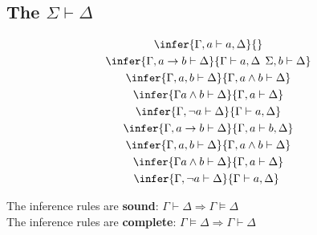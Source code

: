 \documentclass{article}
\begin{document}
\subsection{The $\Sigma \vdash \Delta$}
\begin{gather*}
    \infer{\Gamma, a\vdash a, \Delta}{}\\
    \infer{\Gamma, a \to b \vdash \Delta}{\Gamma \vdash a, \Delta\:\:\Sigma,b\vdash \Delta}\\
    \infer{\Gamma,a,b\vdash \Delta}{\Gamma,a\wedge b\vdash \Delta}\\ 
    \infer{\Gamma a\wedge b\vdash \Delta}{\Gamma, a\vdash \Delta}\\ 
    \infer{\Gamma,\neg a\vdash\Delta}{\Gamma\vdash a,\Delta}\\
    \infer{\Gamma, a \to b \vdash \Delta}{\Gamma,a\vdash b, \Delta}\\
    \infer{\Gamma,a,b\vdash \Delta}{\Gamma,a\wedge b\vdash \Delta}\\ 
    \infer{\Gamma a\wedge b\vdash \Delta}{\Gamma, a\vdash \Delta}\\ 
    \infer{\Gamma,\neg a\vdash\Delta}{\Gamma\vdash a,\Delta}
\
\end{gather*}
\begin{theorem}
    The inference rules are \textbf{sound}: $\Gamma\vdash\Delta \Rightarrow \Gamma\vDash \Delta$\\
    The inference rules are \textbf{complete}: $\Gamma\vDash\Delta\Rightarrow\Gamma\vdash\Delta$
\end{theorem}
\end{document}
